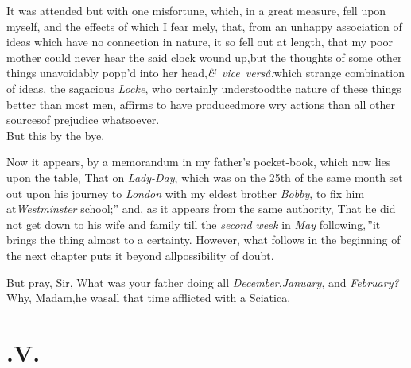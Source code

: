 \documentclass{article}
\begin{document}
It was attended but with one misfortune, which, in a great
measure, fell upon myself, and the effects of which I fear\break
{}
mely, that, from an unhappy association
of ideas which have no connection in nature, it so fell out at
length, that my poor mother could never hear the said clock wound
up,\tsk  but the thoughts of some other things unavoidably
popp’d into her head,\tsk  \hbox{{\small\itshape\egb\&} \textit{vice
versâ:}}\tsk  which strange combination of ideas, the
sagacious \textit{Locke}, who certainly understood\break the nature of
these things better than most men, affirms to have produced\break more
wry actions than all other sources\break of prejudice whatsoever.\\
\indent But this by the bye.\hfill{}

Now it appears, by a memorandum in my father’s pocket-book, which now lies upon
the table, \lqq That on \textit{Lady-Day}, which was on the 25th of
the same month 
set out upon his journey to \textit{London} with my eldest brother
\textit{Bobby}, to fix him at\break\textit{Westminster} school;” and,
as it appears from the same authority, \lqq That he did not get
down to his wife and family till the \textit{second week} in
\textit{May} following,\,”\tsk  it brings the thing almost to a
certainty.\break
However, what follows in the beginning of the next
chapter puts it beyond all\break possibility of doubt.

\tsh  But pray, Sir, What was your father doing
all \textit{December},\tsk\textit{January}, and
\textit{February?}\tsh  Why, Madam,\tsk  he was\break all that
time afflicted with a Sciatica.
\hfill{}

\null
\section{.\enspace V.}
\end{document}
